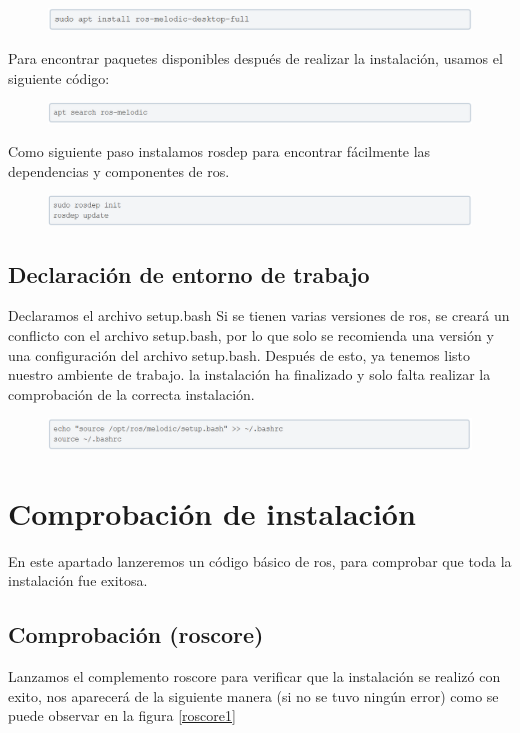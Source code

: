 \documentclass[11pt,a4paper,oldfontcommands,oneside]{memoir}
\begin{document}
\begin{figure}[h]
\includegraphics[scale=.8]{link13.png}
\end{figure}

Para encontrar paquetes disponibles después de realizar la instalación, usamos el siguiente código:

\begin{figure}[h]
\includegraphics[scale=.8]{link15.png}
\end{figure}

Como siguiente paso instalamos rosdep para encontrar fácilmente las dependencias y componentes de ros.

\begin{figure}[h]
\includegraphics[scale=.8]{link16.png}
\end{figure}

\section{Declaración de entorno de trabajo}
Declaramos el archivo setup.bash
Si se tienen varias versiones de ros, se creará un conflicto con el archivo setup.bash, por lo que solo se recomienda una versión y una configuración del archivo setup.bash.
Después de esto, ya tenemos listo nuestro ambiente de trabajo. la instalación ha finalizado y solo falta realizar la comprobación de la correcta instalación.

\begin{figure}[h]
\includegraphics[scale=.8]{link17.png}
\end{figure}
\chapter{Comprobación de instalación}
En este apartado lanzeremos un código básico de ros, para comprobar que toda la instalación fue exitosa.
\section{Comprobación (roscore)}
Lanzamos el complemento roscore para verificar que la instalación se realizó con exito, nos aparecerá de la siguiente manera (si no se tuvo ningún error) como se puede observar en la figura \ref{roscore1}
\end{document}
